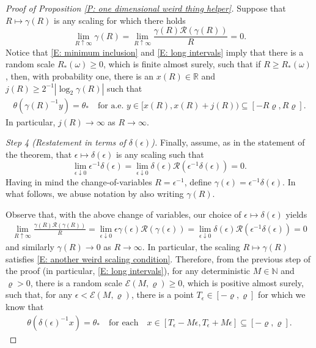 \documentclass[12pt]{amsart}
\begin{document}
\begin{proof}[Proof of Proposition \ref{P: one dimensional weird thing helper}]
Suppose that $R \mapsto \gamma(R) $ is any scaling for which there holds
	\begin{equation} \label{E: another weird scaling condition}
		\lim_{R \uparrow \infty} \gamma(R) = \lim_{R \uparrow \infty} \frac{ \gamma(R) \mathcal{R}(\gamma(R)) }{ R } = 0.
	\end{equation}
Notice that \eqref{E: minimum inclusion} and \eqref{E: long intervals} imply that there is a random scale $R_{*}(\omega) \geq 0$, which is finite almost surely, such that if $R \geq R_{*}(\omega)$, then, with probability one, there is an $x(R) \in \mathbb{R}$ and $j(R) \geq 2^{-1} | \log_{2} \gamma(R) | $ such that 
	\begin{align*}
		\theta(\gamma(R)^{-1} y ) = \theta_{*} \quad \text{for a.e.} \, \, y \in [ x(R), x(R) + j(R) ) \subseteq [-R \varrho, R \varrho ] .
	\end{align*}
In particular, $j(R) \to \infty$ as $R \to \infty$.

\textit{Step 4 (Restatement in terms of $\delta(\epsilon)$).}  Finally, assume, as in the statement of the theorem, that $\epsilon \mapsto \delta(\epsilon)$ is any scaling such that
	\begin{equation*}
		\lim_{\epsilon \downarrow 0} \epsilon^{-1} \delta(\epsilon)
		= \lim_{\epsilon \downarrow 0} \delta(\epsilon) \mathcal{R}(\epsilon^{-1} \delta(\epsilon)) = 0.
	\end{equation*}
Having in mind the change-of-variables $R = \epsilon^{-1}$, define $\gamma(\epsilon) = \epsilon^{-1} \delta(\epsilon)$.  In what follows, we abuse notation by also writing $\gamma(R)$.

Observe that, with the above change of variables, our choice of $\epsilon \mapsto \delta(\epsilon)$ yields
	\begin{align*}
		\lim_{ R \uparrow \infty } \frac{ \gamma(R) \mathcal{R}(\gamma(R)) }{ R } = \lim_{ \epsilon \downarrow 0 } \epsilon \gamma( \epsilon ) \mathcal{R} ( \gamma ( \epsilon ) ) = \lim_{ \epsilon \downarrow 0 } \delta( \epsilon ) \mathcal{R} ( \epsilon^{-1} \delta ( \epsilon ) ) = 0
	\end{align*}
and similarly $\gamma(R) \to 0$ as $R \to \infty$.  In particular, the scaling $R \mapsto \gamma(R)$ satisfies \eqref{E: another weird scaling condition}.  Therefore, from the previous step of the proof (in particular, \eqref{E: long intervals}), for any deterministic $M \in \mathbb{N}$ and $\varrho > 0$, there is a random scale $\mathcal{E}(M,\varrho) \geq 0$, which is positive almost surely, such that, for any $\epsilon < \mathcal{E}(M,\varrho)$, there is a point $T_{\epsilon} \in [-\varrho,\varrho]$ for which we know that
	\begin{align} \label{E: long intervals redux}
		\theta(\delta(\epsilon)^{-1} x) = \theta_{*} \quad \text{for each} \quad x \in [T_{\epsilon} - M \epsilon, T_{\epsilon} + M \epsilon] \subseteq [-\varrho,\varrho].
	\end{align}\end{proof}
	
\end{document}

